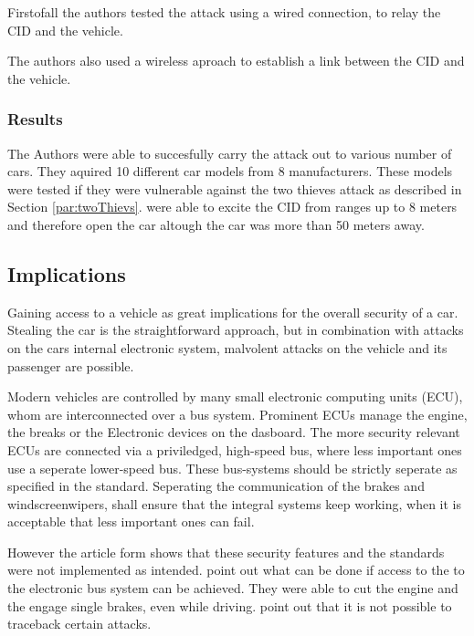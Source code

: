 	Firstofall the authors tested the attack using a wired connection,
	to relay the CID and the vehicle.

	The authors also used a wireless aproach to establish a link between the CID and the vehicle.

\subsubsection*{Results}
	The Authors were able to succesfully carry the attack out to various number of cars.
	They aquired 10 different car models from 8 manufacturers.
	These models were tested if they were vulnerable against the two thieves attack as described in 
	Section \ref{par:twoThievs}.
	\citeauthor{relayAttacksFranc} were able to excite the CID from ranges up to 8 meters
	and therefore open the car altough the car was more than 50 meters away.

\subsection*{Implications}
	\label{sec:attackImplications}
	Gaining access to a vehicle as great implications for the overall security of a car.
	Stealing the car is the straightforward approach,
	but in combination with attacks on the cars internal electronic system,
	malvolent attacks on the vehicle and its passenger are possible.

	Modern vehicles are controlled by many small electronic computing units (ECU),
	whom are interconnected over a bus system.
	Prominent ECUs manage the engine, the breaks or the Electronic devices on the dasboard.
	The more security relevant ECUs are connected via a priviledged,
	high-speed bus,
	where less important ones use a seperate lower-speed bus.
	These bus-systems should be strictly seperate as specified in the standard. %
	Seperating the communication of the brakes and windscreenwipers,
	shall ensure that the integral systems keep working,
	when it is acceptable that less important ones can fail.

	However the article form \citeauthor{expModernAuto} %
	shows that these security features and the standards were not implemented as intended.
	point out what can be done if access to the to the electronic bus system can be achieved.
	They were able to cut the engine and the engage single brakes,
	even while driving.
	point out that it is not possible to traceback certain attacks.	%

